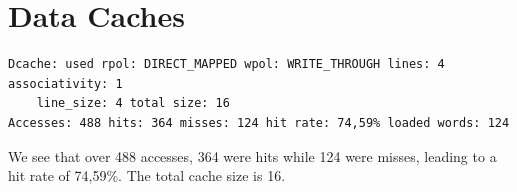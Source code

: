 \documentclass[a4paper]{report}
\begin{document}

\section{Data Caches}

\begin{verbatim}
Dcache: used rpol: DIRECT_MAPPED wpol: WRITE_THROUGH lines: 4 associativity: 1
    line_size: 4 total size: 16
Accesses: 488 hits: 364 misses: 124 hit rate: 74,59% loaded words: 124
\end{verbatim}

We see that over 488 accesses, 364 were hits while 124 were misses, leading to a hit rate of 74,59\%. The
total cache size is 16.
\end{document}

